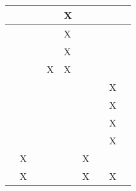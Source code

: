 \begin{longtable}{|l|llllllll|}
    \cite[]{Furrer.2016}          & \multicolumn{1}{l|}{}   & \multicolumn{1}{l|}{}    & \multicolumn{1}{l|}{}   & \multicolumn{1}{l|}{X}   & \multicolumn{1}{l|}{}   & \multicolumn{1}{l|}{}   & \multicolumn{1}{l|}{}      \\ \hline
    \cite[]{Silano.2020}          & \multicolumn{1}{l|}{}   & \multicolumn{1}{l|}{}    & \multicolumn{1}{l|}{}   & \multicolumn{1}{l|}{X}   & \multicolumn{1}{l|}{}   & \multicolumn{1}{l|}{}   & \multicolumn{1}{l|}{}      \\ \hline
    \cite[]{Shah.2017}            & \multicolumn{1}{l|}{}   & \multicolumn{1}{l|}{}    & \multicolumn{1}{l|}{}   & \multicolumn{1}{l|}{X}   & \multicolumn{1}{l|}{}   & \multicolumn{1}{l|}{}   & \multicolumn{1}{l|}{}      \\ \hline
    \cite[]{Panerati.332021}      & \multicolumn{1}{l|}{}   & \multicolumn{1}{l|}{}    & \multicolumn{1}{l|}{X}   & \multicolumn{1}{l|}{X}   & \multicolumn{1}{l|}{}   & \multicolumn{1}{l|}{}   & \multicolumn{1}{l|}{}      \\ \hline
    \cite[]{Moos.2022}            & \multicolumn{1}{l|}{}   & \multicolumn{1}{l|}{}    & \multicolumn{1}{l|}{}   & \multicolumn{1}{l|}{}   & \multicolumn{1}{l|}{}   & \multicolumn{1}{l|}{}   & \multicolumn{1}{l|}{X}      \\ \hline
    \cite[]{Pullum.2022}          & \multicolumn{1}{l|}{}   & \multicolumn{1}{l|}{}    & \multicolumn{1}{l|}{}   & \multicolumn{1}{l|}{}   & \multicolumn{1}{l|}{}   & \multicolumn{1}{l|}{}   & \multicolumn{1}{l|}{X}      \\ \hline
    \cite[]{Liu.2023}             & \multicolumn{1}{l|}{}   & \multicolumn{1}{l|}{}    & \multicolumn{1}{l|}{}   & \multicolumn{1}{l|}{}   & \multicolumn{1}{l|}{}   & \multicolumn{1}{l|}{}   & \multicolumn{1}{l|}{X}      \\ \hline
    \cite[]{YanDuan.2016}         & \multicolumn{1}{l|}{}   & \multicolumn{1}{l|}{}    & \multicolumn{1}{l|}{}   & \multicolumn{1}{l|}{}   & \multicolumn{1}{l|}{}   & \multicolumn{1}{l|}{}   & \multicolumn{1}{l|}{X}      \\ \hline
    \cite[]{Schott.2022}          & \multicolumn{1}{l|}{X}   & \multicolumn{1}{l|}{}    & \multicolumn{1}{l|}{}   & \multicolumn{1}{l|}{}   & \multicolumn{1}{l|}{X}   & \multicolumn{1}{l|}{}   & \multicolumn{1}{l|}{}      \\ \hline
    \cite[]{Pinto.2017}           & \multicolumn{1}{l|}{X}   & \multicolumn{1}{l|}{}    & \multicolumn{1}{l|}{}   & \multicolumn{1}{l|}{}   & \multicolumn{1}{l|}{X}   & \multicolumn{1}{l|}{}   & \multicolumn{1}{l|}{X}      \\ \hline

\end{longtable}
